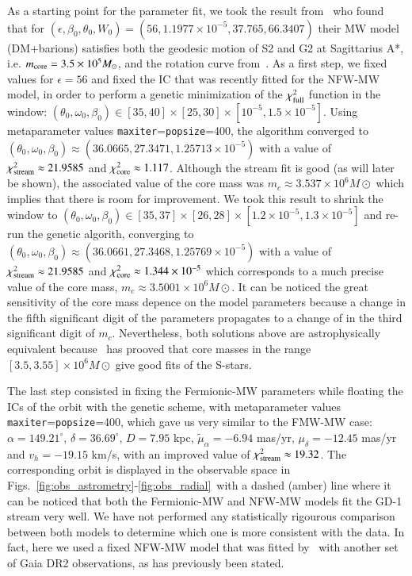 \documentclass[twocolumn]{aa}
\begin{document}
As a starting point for the parameter fit, we took the result from~\citet{2020A&A...641A..34B} who found that for $(\epsilon, \beta_0, \theta_0, W_0)=(56, 1.1977\times10^{-5}, 37.765, 66.3407)$
their MW model (DM+barions) satisfies both the geodesic motion of S2 and G2 at Sagittarius A*, i.e. $m_{\rm core}=3.5\times 10^5 M_\odot$, and the rotation curve from~\citet{sofue_rotation_2013}.
As a first step, we fixed values for $\epsilon=56$ and
fixed the IC that was recently fitted for the NFW-MW model, in order to perform a genetic minimization of the
$\chi^2_{\rm{full}}$ function in the window:
$(\theta_0,\omega_0, \beta_0)\in [35, 40]\times[25, 30]\times[10^{-5}, 1.5\times10^{-5}]$. Using metaparameter values \texttt{maxiter}=\texttt{popsize}=400, the algorithm converged to
$(\theta_0, \omega_0, \beta_0)\approx (36.0665,27.3471 , 1.25713\times10^{-5})$
 with a value of $\chi^2_{\rm{stream}}\approx 21.9585$ and  $\chi^2_{\rm{core}}\approx 1.117$.
 Although the stream fit is good (as will later be shown), the associated value of the core mass was
 $m_c\approx 3.537\times 10^6 M\odot$ which implies that there is room for improvement.
We took this result to shrink the window to $(\theta_0,\omega_0, \beta_0)\in [35, 37]\times[26, 28]\times[1.2\times 10^{-5}, 1.3\times10^{-5}]$ and re-run the genetic algorith, converging
to $(\theta_0, \omega_0, \beta_0)\approx (36.0661, 27.3468,1.25769\times10^{-5})$ with a value of $\chi^2_{\rm{stream}}\approx 21.9585$ and  $\chi^2_{\rm{core}}\approx 1.344\times10^{-5}$ which corresponds to
 a much precise value of the core mass, $m_c\approx 3.5001\times 10^6  M\odot$. It can be noticed the great sensitivity of the core mass depence on the model parameters because a change in the fifth significant digit of the parameters propagates to a change of in  the third significant digit of $m_c$. Nevertheless, both solutions above are astrophysically equivalent because~\citet{2021MNRAS.505L..64B} has prooved that core masses in the range $[3.5, 3.55]\times 10^6 M\odot$ give good fits of the S-stars.

The last step consisted in fixing the Fermionic-MW parameters while floating the ICs of the orbit with the genetic scheme, with metaparameter values \texttt{maxiter}=\texttt{popsize}=400, which gave us very similar to the FMW-MW case:
$\alpha=149.21^{\circ}$, $\delta=36.69^{\circ}$, $D=7.95$ kpc,
$\tilde{\mu}_\alpha=-6.94$ mas/yr, $\mu_\delta=-12.45$ mas/yr and $v_h=-19.15$ km/s, with an improved
value of $\chi^2_{\rm{stream}}\approx 19.32$.
The corresponding orbit is displayed in the observable space in
Figs.~\ref{fig:obs_astrometry}-\ref{fig:obs_radial}~with a dashed (amber) line where it can be noticed that both the Fermionic-MW and NFW-MW models fit the GD-1 stream very well.
We have not performed any statistically rigourous comparison between both models to determine which one is
more consistent with the data. In fact, here we used a fixed NFW-MW model that was fitted by~\citet{2019MNRAS.486.2995M} with another set of Gaia DR2 observations, as has previously been stated.\\
%
\end{document}
